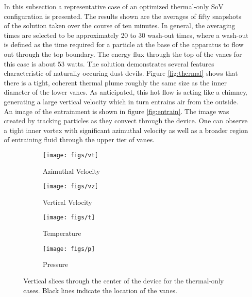 In this subsection a representative case of an optimized thermal-only SoV
configuration is presented. 
The results shown are the averages of fifty snapshots of the solution 
taken over the course of ten minutes. In general,
the averaging times are selected to be approximately 20 to 30 wash-out 
times, where a
wash-out is defined as the time required for a particle at the base of
the apparatus to flow out through the top boundary. The energy flux
through the top of the vanes for this case is about 53 watts. The solution
demonstrates several features characteristic of naturally occuring dust
devils. Figure \ref{fig:thermal} shows that there is a tight,
coherent thermal plume roughly the same size as the inner diameter of the
lower vanes. As anticipated, this hot flow is acting like a chimney,
generating a large vertical velocity which in turn entrains air from the outside.
An image of the entrainment is shown in figure
\ref{fig:entrain}. The image was created by tracking particles as they 
convect through the device. 
One can
observe a tight inner vortex with significant azimuthal velocity 
as well as a broader region of entraining fluid through the 
upper tier of vanes. 

\begin{figure}[htb]

 \begin{subfigure}{.5\textwidth}
  \centering
  \texttt{[image: figs/vt]}
  \caption{Azimuthal Velocity}
  \label{fig:vt-to}
 \end{subfigure}%
 \begin{subfigure}{.5\textwidth}
  \centering
  \texttt{[image: figs/vz]}
  \caption{Vertical Velocity}
  \label{fig:vz-to}
 \end{subfigure}%


 \begin{subfigure}{.5\textwidth}
  \centering
  \texttt{[image: figs/t]}
  \caption{Temperature}
  \label{fig:t-to}
 \end{subfigure}%
 \begin{subfigure}{.5\textwidth}
  \centering
  \texttt{[image: figs/p]}
  \caption{Pressure}
  \label{fig:p-to}
 \end{subfigure}%

 \caption{Vertical slices through the center of the device for the thermal-only cases. Black lines 
   indicate the location of the vanes.}
 \label{fig:to-vert}
\end{figure}

